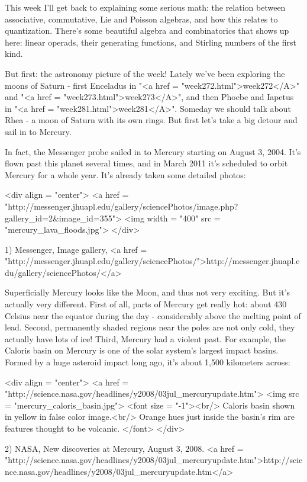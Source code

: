 



This week I'll get back to explaining some serious math: the relation
between associative, commutative, Lie and Poisson algebras, and how
this relates to quantization.  There's some beautiful algebra and
combinatorics that shows up here: linear operads, their generating
functions, and Stirling numbers of the first kind.

But first: the astronomy picture of the week!  Lately we've been
exploring the moons of Saturn - first Enceladus in "<a href =
"week272.html">week272</A>" and "<a href =
"week273.html">week273</A>", and then Phoebe and Iapetus in
"<a href = "week281.html">week281</A>".  Someday we should
talk about Rhea - a moon of Saturn with its own rings.  But first
let's take a big detour and sail in to Mercury.

In fact, the Messenger probe sailed in to Mercury starting on
August 3, 2004.  It's flown past this planet several times, and
in March 2011 it's scheduled to orbit Mercury for a whole year.
It's already taken some detailed photos:

<div align = "center">
<a href = "http://messenger.jhuapl.edu/gallery/sciencePhotos/image.php?gallery_id=2&image_id=355">
<img width = "400" src = "mercury_lava_floods.jpg">
</div>

1) Messenger, Image gallery,
<a href = "http://messenger.jhuapl.edu/gallery/sciencePhotos/">http://messenger.jhuapl.edu/gallery/sciencePhotos/</a>

Superficially Mercury looks like the Moon, and thus not very exciting.
But it's actually very different.  First of all, parts of Mercury get
really hot: about 430 Celsius near the equator during the day -
considerably above the melting point of lead.  Second, permanently
shaded regions near the poles are not only cold, they actually have
lots of ice!  Third, Mercury had a violent past.  For example,
the Caloris basin on Mercury is one of the solar system's largest
impact basins.  Formed by a huge asteroid impact long ago, it's about
1,500 kilometers across:

<div align = "center">
<a href = "http://science.nasa.gov/headlines/y2008/03jul_mercuryupdate.htm">
<img src = "mercury_caloris_basin.jpg">
<font size = "-1"><br/>
Caloris basin shown in yellow in false color image.<br/>
Orange hues just inside the basin's rim are features thought 
to be volcanic.
</font>
</div>


2) NASA, New discoveries at Mercury, August 3, 2008.
<a href = "http://science.nasa.gov/headlines/y2008/03jul_mercuryupdate.htm">http://science.nasa.gov/headlines/y2008/03jul_mercuryupdate.htm</a>

